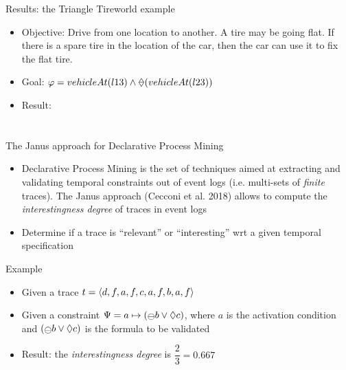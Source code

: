 \documentclass{beamer}
\begin{document}
\begin{frame}{Results: the Triangle Tireworld example}
\begin{itemize}
\item Objective: Drive from one location to another. A tire may be going flat. If there is a spare tire in the location of the car, then the car can use it to fix the flat tire.

\item Goal: $\varphi = vehicleAt(l13) \lAND \Once (vehicleAt(l23))$

\item Result:
\end{itemize}


\end{frame}


\section{\janus}
\begin{frame}{The Janus approach for Declarative Process Mining}
\begin{itemize}
\item Declarative Process Mining is the set of techniques aimed at extracting and validating temporal constraints out of event logs (i.e. multi-sets of \emph{finite} traces). The Janus approach (Cecconi et al. 2018) allows to compute the \emph{interestingness degree} of traces in event logs

\item Determine if a trace is ``relevant'' or ``interesting'' wrt a given temporal specification

\end{itemize}

\begin{exampleblock}{Example}
\begin{itemize}
\item Given a trace $t = \langle d,f,a,f,c,a,f,b,a,f \rangle$
\item Given a constraint $\Psi = a \mapsto (\Yesterday b \lOR \Diamond c)$, where $a$ is the activation condition and $(\Yesterday b \lOR \Diamond c)$ is the formula to be validated
\item Result: the \emph{interestingness degree} is $\dfrac{2}{3} = 0.667$
\end{itemize}
\end{exampleblock}

\end{frame}
\end{document}
